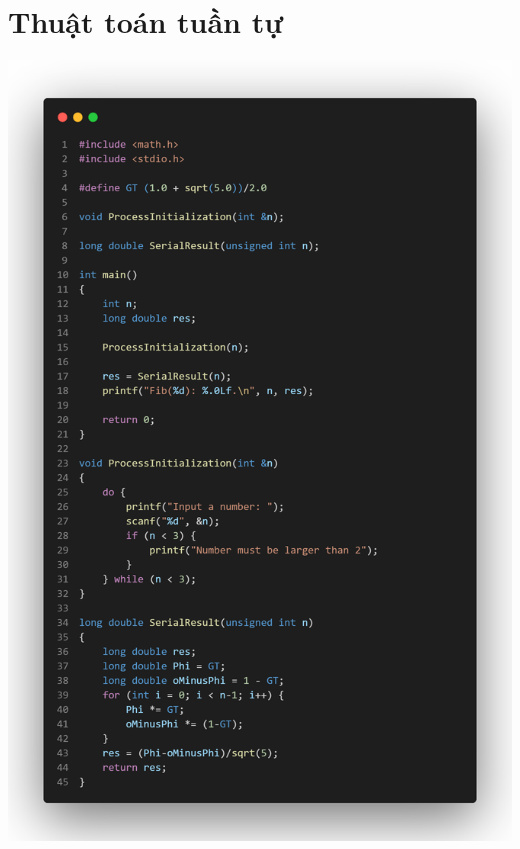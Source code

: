 \documentclass[12pt,a4paper]{report}
\begin{document}
\section{Thuật toán tuần tự}
\begin{center}
	\includegraphics[trim=0in 0in 0in 0in, clip, scale=0.2]{./Photos/Fibonacci/Serial.PNG}
\end{center}
\end{document}
